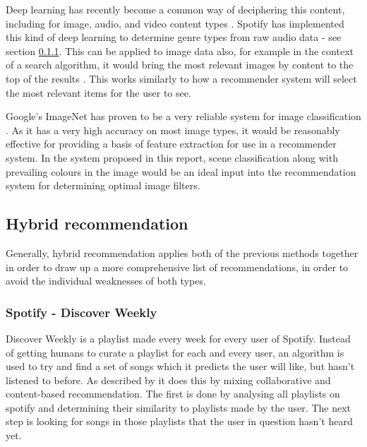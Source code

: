 \documentclass[a4paper,12pt]{report}
\begin{document}
        Deep learning has recently become a common way of deciphering this content, including for image, audio, and video content types \citep{coates2011analysis,ciregan2012multi,lee2009unsupervised,mobahi2009deep}.
        Spotify has implemented this kind of deep learning to determine genre types from raw audio data - see section \ref{discoverweekly}.
        This can be applied to image data also, for example in the context of a search algorithm, it would bring the most relevant images by content to the top of the results \citep{yee2003faceted}. This works similarly to how a recommender system will select the most relevant items for the user to see.

        Google's ImageNet has proven to be a very reliable system for image classification \citep{krizhevsky2012imagenet}.
        As it has a very high accuracy on most image types, it would be reasonably effective for providing a basis of feature extraction for use in a recommender system. In the system proposed in this report, scene classification along with prevailing colours in the image would be an ideal input into the recommendation system for determining optimal image filters.


    \subsection{Hybrid recommendation}
      Generally, hybrid recommendation applies both of the previous methods together in order to draw up a more comprehensive list of recommendations, in order to avoid the individual weaknesses of both types.

      \subsubsection{Spotify - Discover Weekly}
      \label{discoverweekly}
        Discover Weekly is a playlist made every week for every user of Spotify. Instead of getting humans to curate a playlist for each and every user, an algorithm is used to try and find a set of songs which it predicts the user will like, but hasn't listened to before. As described by \cite{popper2015dw} it does this by mixing collaborative and content-based recommendation. The first is done by analysing all playlists on spotify and determining their similarity to playlists made by the user. The next step is looking for songs in those playlists that the user in question hasn't heard yet.
\end{document}
